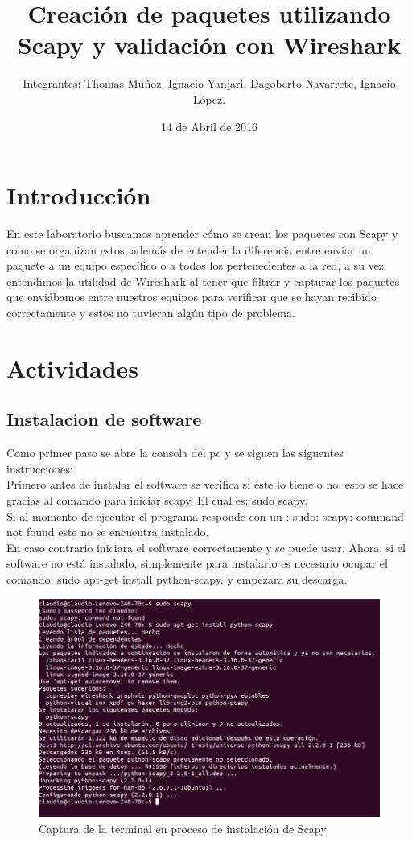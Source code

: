 \documentclass{udpreport}
\title{Creación de paquetes utilizando Scapy y validación con Wireshark}
\author{Integrantes: Thomas Muñoz, Ignacio Yanjari, Dagoberto Navarrete, Ignacio López.}
\date{14 de Abril de 2016}
\begin{document}
\maketitle
\tableofcontents
\chapter{Introducción}
	En este laboratorio buscamos aprender cómo se crean los paquetes con Scapy y como se organizan estos, además de entender la
	diferencia entre enviar un paquete a un equipo específico o a todos los pertenecientes a la red, a su vez entendimos la
	utilidad de Wireshark al tener que filtrar y capturar los paquetes que enviábamos entre nuestros equipos para verificar que se
	hayan recibido correctamente y estos no tuvieran algún tipo de problema.
\chapter{Actividades}
	\section{Instalacion de software}
	Como primer paso se abre la consola del pc y se siguen las siguentes instrucciones:\\
	Primero antes de instalar el software se  verifica si éste lo tiene o no.
	esto se hace gracias al comando para iniciar scapy. El cual es: sudo scapy.\\
	Si al momento de ejecutar el programa responde con un :  sudo: scapy: command not found 
	este no se encuentra instalado. \\
	En caso contrario iniciara el software correctamente y se puede usar.
	Ahora, si el software no está instalado, simplemente para instalarlo
	es necesario ocupar el comando: sudo apt-get install python-scapy.
	y empezara su descarga.\\
	\begin{figure}[h]
	\centering
	\includegraphics[width=\textwidth]{Instalacion.png}
	\caption{Captura de la terminal en proceso de instalación de Scapy}
	\end{figure}\\
\end{document}
